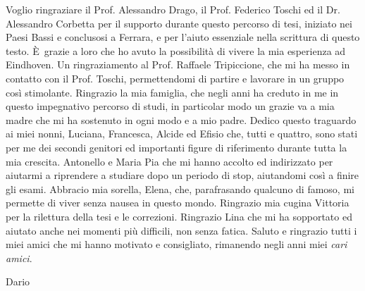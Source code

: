 \documentclass{standalone}
\begin{document}
Voglio ringraziare il Prof. Alessandro Drago, il Prof. Federico Toschi ed il Dr. Alessandro Corbetta per il supporto durante questo percorso di tesi, iniziato nei Paesi Bassi e conclusosi a Ferrara, e per l'aiuto essenziale nella scrittura di questo testo.
È grazie a loro che ho avuto la possibilità di vivere la mia esperienza ad Eindhoven.
Un ringraziamento al Prof. Raffaele Tripiccione, che mi ha messo in contatto con il Prof. Toschi, permettendomi di partire e lavorare in un gruppo così stimolante.
Ringrazio la mia famiglia, che negli anni ha creduto in me in questo impegnativo percorso di studi, in particolar modo un grazie va a mia madre che mi ha sostenuto in ogni modo e a mio padre.
Dedico questo traguardo ai miei nonni, Luciana, Francesca, Alcide ed Efisio che, tutti e quattro, sono stati per me dei secondi genitori ed importanti figure di riferimento durante tutta la mia crescita.
Antonello e Maria Pia che mi hanno accolto ed indirizzato per aiutarmi a riprendere a studiare dopo un periodo di stop, aiutandomi così a finire gli esami.
Abbracio mia sorella, Elena, che, parafrasando qualcuno di famoso, mi permette di viver senza nausea in questo mondo.
Ringrazio mia cugina Vittoria per la rilettura della tesi e le correzioni.
Ringrazio Lina che mi ha sopportato ed aiutato anche nei momenti più difficili, non senza fatica.
Saluto e ringrazio tutti i miei amici che mi hanno motivato e consigliato, rimanendo negli anni miei \emph{cari amici}.

\vspace*{8mm}
\hspace*{13.5cm} Dario
\end{document}
